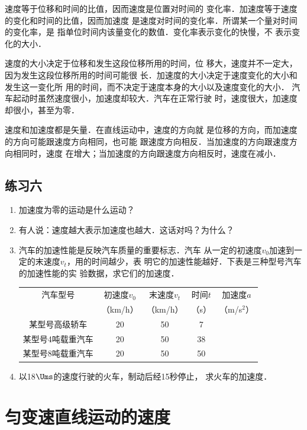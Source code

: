     速度等于位移和时间的比值，因而速度是位置对时间的
变化率．加速度等于速度的变化和时间的比值，因而加速度
是速度对时间的变化率．所谓某一个量对时间的变化率，是
指单位时间内该量变化的数值．变化率表示变化的快慢，不
表示变化的大小．

    速度的大小决定于位移和发生这段位移所用的时间，位
移大，速度并不一定大，因为发生这段位移所用的时间可能很
长．加速度的大小决定于速度变化的大小和发生这一变化所
用的时间，而不决定于速度本身的大小以及速度变化的大小．
汽车起动时虽然速度很小，加速度却较大．汽车在正常行驶
时，速度很大，加速度却很小，甚至为零．

    速度和加速度都是矢量．在直线运动中，速度的方向就
是位移的方向，而加速度的方向可能跟速度方向相同，也可能
跟速度方向相反．当加速度的方向跟速度方向相同时，速度
在增大；当加速度的方向跟速度方向相反时，速度在减小．

\subsection*{练习六}
\begin{enumerate}
\item  加速度为零的运动是什么运动？
\item  有人说：速度越大表示加速度也越大．这话对吗？为什么？
\item  汽车的加速性能是反映汽车质量的重要标志．汽车
从一定的初速度$v_0$加速到一定的末速度$v_t$，用的时间越少，表
明它的加速性能越好．下表是三种型号汽车的加速性能的实
验数据，求它们的加速度．
\begin{center}
\vspace{0.3cm}
\begin{tabular}{ccccc}
\toprule
汽车型号 & 初速度$v_0$ & 末速度$v_t$ & 时间$t$ & 加速度$a$\\
& （km/h）& （km/h）& （s）& （m/s$^2$）\\
\midrule
某型号高级轿车& 20& 50& 7 \\
某型号4吨载重汽车& 20& 50& 38\\
某型号8吨载重汽车& 20& 50& 50\\
\bottomrule
\end{tabular}
\vspace{0.3cm}
\end{center}

\item   以18$\Ums$的速度行驶的火车，制动后经15秒停止，
求火车的加速度．

\end{enumerate}

\section{匀变速直线运动的速度}

